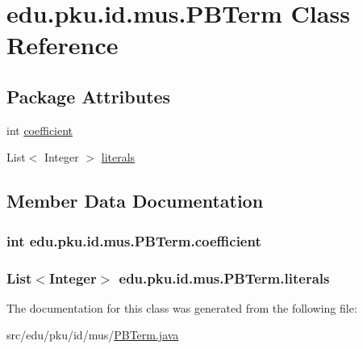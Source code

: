 \hypertarget{classedu_1_1pku_1_1id_1_1mus_1_1_p_b_term}{
\section{edu.pku.id.mus.PBTerm Class Reference}
\label{classedu_1_1pku_1_1id_1_1mus_1_1_p_b_term}
}
\subsection*{Package Attributes}
\begin{DoxyCompactItemize}
\item 
int \hyperlink{classedu_1_1pku_1_1id_1_1mus_1_1_p_b_term_af686c2a9f24e5e40914ab467085e3181}{coefficient}
\item 
List$<$ Integer $>$ \hyperlink{classedu_1_1pku_1_1id_1_1mus_1_1_p_b_term_ad0638dd3ce98d897f694d299e4890565}{literals}
\end{DoxyCompactItemize}


\subsection{Member Data Documentation}
\hypertarget{classedu_1_1pku_1_1id_1_1mus_1_1_p_b_term_af686c2a9f24e5e40914ab467085e3181}{
\subsubsection[{coefficient}]{\setlength{\rightskip}{0pt plus 5cm}int {\bf edu.pku.id.mus.PBTerm.coefficient}}}
\label{classedu_1_1pku_1_1id_1_1mus_1_1_p_b_term_af686c2a9f24e5e40914ab467085e3181}
\hypertarget{classedu_1_1pku_1_1id_1_1mus_1_1_p_b_term_ad0638dd3ce98d897f694d299e4890565}{
\subsubsection[{literals}]{\setlength{\rightskip}{0pt plus 5cm}List$<$Integer$>$ {\bf edu.pku.id.mus.PBTerm.literals}}}
\label{classedu_1_1pku_1_1id_1_1mus_1_1_p_b_term_ad0638dd3ce98d897f694d299e4890565}


The documentation for this class was generated from the following file:\begin{DoxyCompactItemize}
\item 
src/edu/pku/id/mus/\hyperlink{_p_b_term_8java}{PBTerm.java}\end{DoxyCompactItemize}
